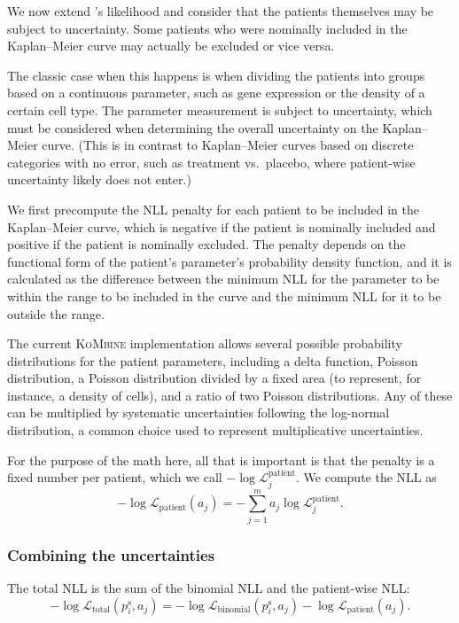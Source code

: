 \documentclass[pdflatex,sn-basic]{sn-jnl}%
\theoremstyle{thmstyleone}%
\theoremstyle{thmstyletwo}%
\theoremstyle{thmstylethree}%
\newcommand{\KM}{Kaplan--Meier} %
\newcommand{\KoMbine}{\textsc{KoMbine}}
\begin{document}
We now extend \citeauthor{ThomasGrunkemeier}'s likelihood and consider that the patients themselves may be subject to uncertainty. Some patients who were nominally included in the \KM{} curve may actually be excluded or vice versa.

The classic case when this happens is when dividing the patients into groups based on a continuous parameter, such as gene expression or the density of a certain cell type. The parameter measurement is subject to uncertainty, which must be considered when determining the overall uncertainty on the \KM{} curve. (This is in contrast to \KM{} curves based on discrete categories with no error, such as treatment vs.\ placebo, where patient-wise uncertainty likely does not enter.)

We first precompute the NLL penalty for each patient to be included in the \KM{} curve, which is negative if the patient is nominally included and positive if the patient is nominally excluded. The penalty depends on the functional form of the patient's parameter's probability density function, and it is calculated as the difference between the minimum NLL for the parameter to be within the range to be included in the curve and the minimum NLL for it to be outside the range.

The current \KoMbine{} implementation allows several possible probability distributions for the patient parameters, including a delta function, Poisson distribution, a Poisson distribution divided by a fixed area (to represent, for instance, a density of cells), and a ratio of two Poisson distributions. Any of these can be multiplied by systematic uncertainties following the log-normal distribution, a common choice used to represent multiplicative uncertainties.

For the purpose of the math here, all that is important is that the penalty is a fixed number per patient, which we call \(-\log \mathcal{L}_j^{\text{patient}}\). We compute the NLL as
\begin{equation}
-\log \mathcal{L}_{\text{patient}}(a_j) = -\sum_{j=1}^{m} a_j\log \mathcal{L}_j^{\text{patient}}. \label{eq:patient-nll}
\end{equation}

\subsubsection{Combining the uncertainties}\label{sec:combining-uncertainties}

The total NLL is the sum of the binomial NLL and the patient-wise NLL\@:
\begin{equation}
-\log \mathcal{L}_{\text{total}}(p_i^\text{s}, a_j) = -\log \mathcal{L}_{\text{binomial}}(p_i^\text{s}, a_j) - \log \mathcal{L}_{\text{patient}}(a_j). \label{eq:total-nll}
\end{equation}
\end{document}
